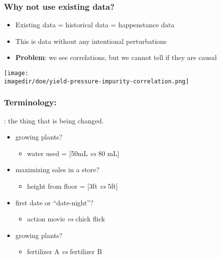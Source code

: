 \begin{frame}\frametitle{Why not use existing data?}
	\begin{itemize}
		\item	Existing data = historical data = happenstance data
		\item	This is data without any intentional perturbations
		\item	\textbf{Problem}: we see correlations, but we cannot tell if they are causal
	\end{itemize}
	\texttt{[image: \\imagedir/doe/yield-pressure-impurity-correlation.png]}
\end{frame}

\begin{frame}\frametitle{Terminology: {\color{purple}{Factors}}}
	{\color{purple}{Factor}}: the thing that is being changed.
	
	\begin{itemize}
		\item	growing plants? 
			\begin{itemize}
				\item	water used = [50mL \emph{vs} 80 mL]
			\end{itemize}
		\item	maximizing sales in a store? 
			\begin{itemize}
				\item	height from floor = [3ft \emph{vs} 5ft]
			\end{itemize}
		\item	first date or ``date-night''?
			\begin{itemize}
				\item	action movie \emph{vs} chick flick
			\end{itemize}
		\item	growing plants?
			\begin{itemize}
				\item	fertilizer A \emph{vs} fertilizer B
			\end{itemize}
	\end{itemize}
\end{frame}

